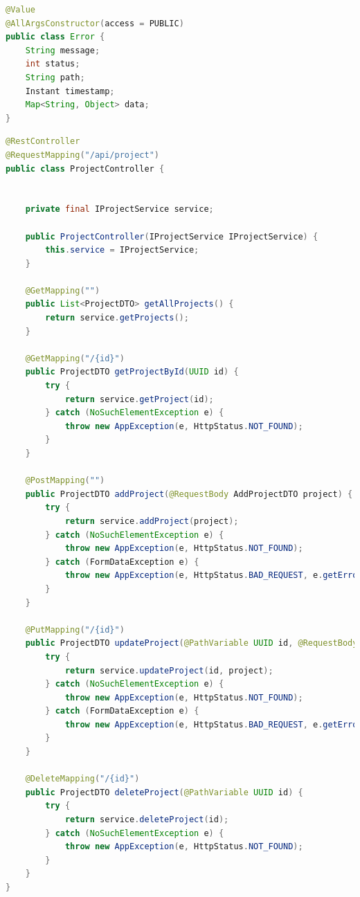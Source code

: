 \begin{lstlisting}[language=Java, caption={Class \textit{Error}}, label={lst:class-Error}]
@Value
@AllArgsConstructor(access = PUBLIC)
public class Error {
    String message;
    int status;
    String path;
    Instant timestamp;
    Map<String, Object> data;
}
\end{lstlisting}





\begin{lstlisting}[language=Java, caption={Class \textit{ProjectController}}, label={lst:class-ProjectController}]
@RestController
@RequestMapping("/api/project")
public class ProjectController {


    private final IProjectService service;

    public ProjectController(IProjectService IProjectService) {
        this.service = IProjectService;
    }

    @GetMapping("")
    public List<ProjectDTO> getAllProjects() {
        return service.getProjects();
    }

    @GetMapping("/{id}")
    public ProjectDTO getProjectById(UUID id) {
        try {
            return service.getProject(id);
        } catch (NoSuchElementException e) {
            throw new AppException(e, HttpStatus.NOT_FOUND);
        }
    }

    @PostMapping("")
    public ProjectDTO addProject(@RequestBody AddProjectDTO project) {
        try {
            return service.addProject(project);
        } catch (NoSuchElementException e) {
            throw new AppException(e, HttpStatus.NOT_FOUND);
        } catch (FormDataException e) {
            throw new AppException(e, HttpStatus.BAD_REQUEST, e.getErrors());
        }
    }

    @PutMapping("/{id}")
    public ProjectDTO updateProject(@PathVariable UUID id, @RequestBody @Valid AddProjectDTO project) {
        try {
            return service.updateProject(id, project);
        } catch (NoSuchElementException e) {
            throw new AppException(e, HttpStatus.NOT_FOUND);
        } catch (FormDataException e) {
            throw new AppException(e, HttpStatus.BAD_REQUEST, e.getErrors());
        }
    }

    @DeleteMapping("/{id}")
    public ProjectDTO deleteProject(@PathVariable UUID id) {
        try {
            return service.deleteProject(id);
        } catch (NoSuchElementException e) {
            throw new AppException(e, HttpStatus.NOT_FOUND);
        }
    }
}
\end{lstlisting}

